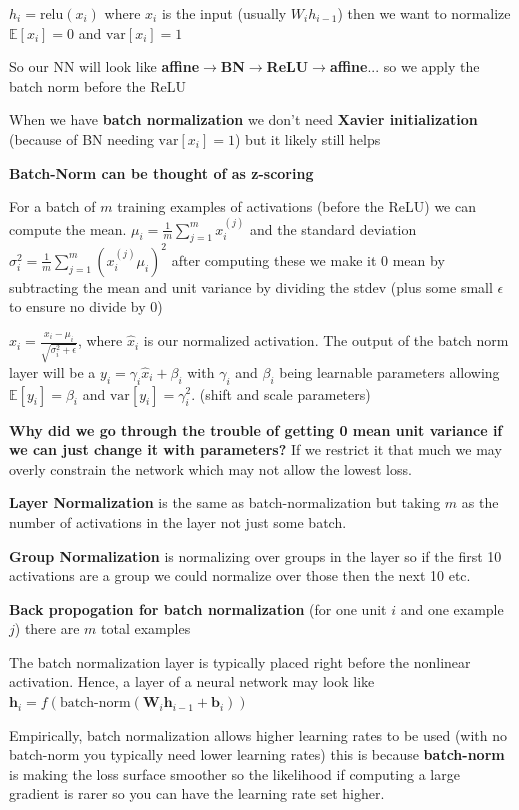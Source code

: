\documentclass[twocolumn, letter, 10pt, landscape]{article}
\newcommand{\mb}{\mathbf}
\newcommand{\tb}{\textbf}
\newcommand{\ex}{\mathbb{E}}
\newcommand{\vt}{\text}
\begin{document}
$h_i = \vt{relu}(x_i)$ where $x_i$ is the input (usually $W_ih_{i-1}$) then we want to normalize $\ex[x_i] = 0$ and $\vt{var}[x_i] = 1$

So our NN will look like \tb{affine}$\rightarrow$\tb{BN}$\rightarrow$\tb{ReLU}$\rightarrow$\tb{affine}... so we apply the batch norm before the ReLU

When we have \tb{batch normalization} we don't need \tb{Xavier initialization} (because of BN needing $\vt{var}[x_i] = 1$) but it likely still helps

\tb{Batch-Norm can be thought of as z-scoring}

For a batch of $m$ training examples of activations (before the ReLU) we can compute the mean. $\mu_i = \frac{1}{m}\sum_{j=1}^mx_i^{(j)}$ and the standard deviation $\sigma_i^2=\frac{1}{m}\sum_{j=1}^m(x_i^{(j)}\mu_i)^2$ after computing these we make it $0$ mean by subtracting the mean and unit variance by dividing the stdev (plus some small $\epsilon$ to ensure no divide by $0$)

$\hat{x}_i=\frac{x_i-\mu_i}{\sqrt{\sigma_i^2+\epsilon}}$, where $\hat{x}_i$ is our normalized activation. The output of the batch norm layer will be a $y_i=\gamma_i\hat{x}_i+\beta_i$ with $\gamma_i$ and $\beta_i$ being learnable parameters allowing $\ex[y_i]=\beta_i$ and $\vt{var}[y_i]=\gamma_i^2$. (shift and scale parameters)

\tb{Why did we go through the trouble of getting 0 mean unit variance if we can just change it with parameters?} If we restrict it that much we may overly constrain the network which may not allow the lowest loss.

\tb{Layer Normalization} is the same as batch-normalization but taking $m$ as the number of activations in the layer not just some batch.

\tb{Group Normalization} is normalizing over groups in the layer so if the first 10 activations are a group we could normalize over those then the next 10 etc.

\tb{Back propogation for batch normalization} (for one unit $i$ and one example $j$) there are $m$ total examples

The batch normalization layer is typically placed right before the nonlinear activation. Hence, a layer of a neural network may look like $\mb{h}_i=f(\vt{batch-norm}(\mb{W}_i\mb{h}_{i-1}+\mb{b}_i))$

Empirically, batch normalization allows higher learning rates to be used (with no batch-norm you typically need lower learning rates) this is because \tb{batch-norm} is making the loss surface smoother so the likelihood if computing a large gradient is rarer so you can have the learning rate set higher.
\end{document}
